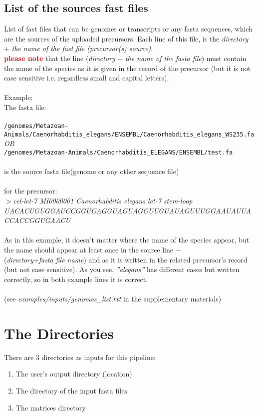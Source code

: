 \documentclass[a4paper,20pt]{report}
\newcommand{\note}{\textcolor{red}}
\begin{document}
\subsection{List of the sources fast files}
\label{sec:genomes}
\noindent
\normalsize
List of fast files that can be genomes or transcripts or any fasta sequences, which are the sources of the uploaded precursors.
Each line of this file, is the \textit{directory} + \textit{the name of the fast file (precursor(s) source)}.\\
\note{\textbf{please note}} that the line (\textit{directory} + \textit{the name of the fasta file}) must contain the name of the species  
as it is given in the record of the precursor (but it is not case sensitive
i.e. regardless small and capital letters).\\\\
Example:\\
The fasta file:\\\\
\verb|/genomes/Metazoan-Animals/Caenorhabditis_elegans/ENSEMBL/Caenorhabditis_elegans_WS235.fa|\\
\textit{OR}\\
\verb|/genomes/Metazoan-Animals/Caenorhabditis_ELEGANS/ENSEMBL/test.fa|\\\\
is the source fasta file(genome or any other sequence file)\\\\
for the precursor:\\
\textit{$>$cel-let-7 MI0000001 Caenorhabditis elegans let-7 stem-loop\\
UACACUGUGGAUCCGGUGAGGUAGUAGGUUGUAUAGUUUGGAAUAUUACCACCGGUGAACU}\\\\
\noindent
As in this example, it doesn't matter where the name of the species appear, but the name should appear 
at least once in the source line $-$\\
(\textit{directory}+\textit{fasta file name}) and as it is written in the related precursor's record (but not case sensitive).
As you see, \textit{''elegans''} has different cases but written correctly, so in both example lines it is correct.\\\\
(see \textit{examples/inputs/genomes\_list.txt} in the supplementary materials)


\section{The Directories}
\noindent
There are 3 directories as inputs for this pipeline:
\begin{enumerate}
 \item The user's output directory (location)
 \item The directory of the input fasta files
 \item The matrices directory
\end{enumerate}
\end{document}
